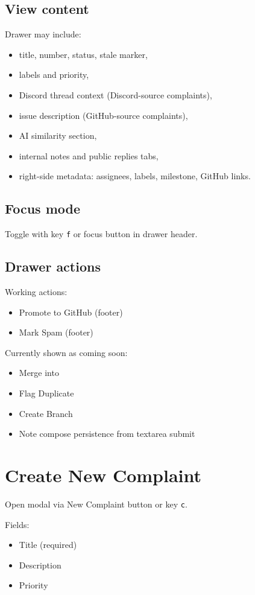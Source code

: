 \documentclass[11pt,a4paper]{article}
\begin{document}
\subsection{View content}
Drawer may include:
\begin{itemize}
  \item title, number, status, stale marker,
  \item labels and priority,
  \item Discord thread context (Discord-source complaints),
  \item issue description (GitHub-source complaints),
  \item AI similarity section,
  \item internal notes and public replies tabs,
  \item right-side metadata: assignees, labels, milestone, GitHub links.
\end{itemize}

\subsection{Focus mode}
Toggle with key \texttt{f} or focus button in drawer header.

\subsection{Drawer actions}
Working actions:
\begin{itemize}
  \item Promote to GitHub (footer)
  \item Mark Spam (footer)
\end{itemize}

Currently shown as coming soon:
\begin{itemize}
  \item Merge into
  \item Flag Duplicate
  \item Create Branch
  \item Note compose persistence from textarea submit
\end{itemize}

\section{Create New Complaint}
Open modal via New Complaint button or key \texttt{c}.

Fields:
\begin{itemize}
  \item Title (required)
  \item Description
  \item Priority
\end{itemize}
\end{document}
